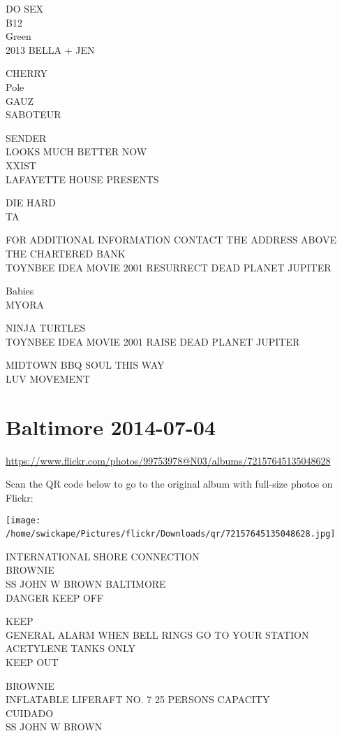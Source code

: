 \documentclass[10pt,letterpaper]{article}
\begin{document}
DO SEX\\
B12\\
Green\\
2013 BELLA + JEN

CHERRY\\
Pole\\
GAUZ\\
SABOTEUR

SENDER\\
LOOKS MUCH BETTER NOW\\
XXIST\\
LAFAYETTE HOUSE PRESENTS

DIE HARD\\
TA

FOR ADDITIONAL INFORMATION CONTACT THE ADDRESS ABOVE\\
THE CHARTERED BANK\\
TOYNBEE IDEA MOVIE 2001 RESURRECT DEAD PLANET JUPITER

Babies\\
MYORA

NINJA TURTLES\\
TOYNBEE IDEA MOVIE 2001 RAISE DEAD PLANET JUPITER

MIDTOWN BBQ SOUL THIS WAY\\
LUV MOVEMENT
\

\section*{Baltimore 2014-07-04}

\url{https://www.flickr.com/photos/99753978@N03/albums/72157645135048628}

Scan the QR code below to go to the original album with full-size photos on Flickr:

\texttt{[image: /home/swickape/Pictures/flickr/Downloads/qr/72157645135048628.jpg]}
\

INTERNATIONAL SHORE CONNECTION\\
BROWNIE\\
SS JOHN W BROWN BALTIMORE\\
DANGER KEEP OFF

KEEP\\
GENERAL ALARM WHEN BELL RINGS GO TO YOUR STATION\\
ACETYLENE TANKS ONLY\\
KEEP OUT

BROWNIE\\
INFLATABLE LIFERAFT NO. 7 25 PERSONS CAPACITY\\
CUIDADO\\
SS JOHN W BROWN
\end{document}
